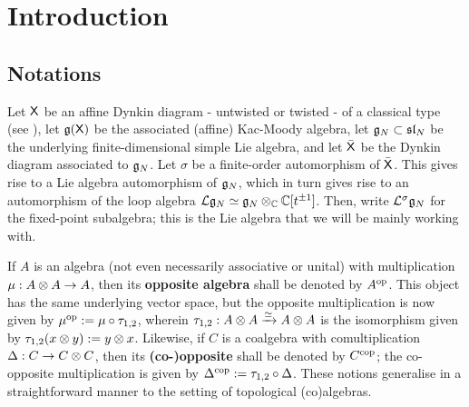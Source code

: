 \section{Introduction}
    \subsection{Notations}
        Let $\mathsf{X}$ be an affine Dynkin diagram - untwisted or twisted - of a classical type (see \cite[Chapter 4, Tables Aff 2 and 3, p. 55]{kac_infinite_dimensional_lie_algebras}), let $\mathfrak{g}(\mathsf{X})$ be the associated (affine) Kac-Moody algebra, let $\mathfrak{g}_N \subset \mathfrak{sl}_N$ be the underlying finite-dimensional simple Lie algebra, and let $\bar{\mathsf{X}}$ be the Dynkin diagram associated to $\mathfrak{g}_N$. Let $\sigma$ be a finite-order automorphism of $\bar{\mathsf{X}}$. This gives rise to a Lie algebra automorphism of $\mathfrak{g}_N$, which in turn gives rise to an automorphism of the loop algebra $\Loop\g_N \cong \g_N \tensor_{\bbC} \bbC[t^{\pm 1}]$. Then, write $\mathcal{L}^{\sigma}\mathfrak{g}_N$ for the fixed-point subalgebra; this is the Lie algebra that we will be mainly working with.

        If $A$ is an algebra (not even necessarily associative or unital) with multiplication $\mu: A \tensor A \to A$, then its \textbf{opposite algebra} shall be denoted by $A^{\mathrm{op}}$. This object has the same underlying vector space, but the opposite multiplication is now given by $\mu^{\mathrm{op}} := \mu \circ \tau_{1, 2}$, wherein $\tau_{1, 2}: A \tensor A \xrightarrow[]{\cong} A \tensor A$ is the isomorphism given by $\tau_{1, 2}(x \tensor y) := y \tensor x$. Likewise, if $C$ is a coalgebra with comultiplication $\Delta: C \to C \tensor C$, then its \textbf{(co-)opposite} shall be denoted by $C^{\mathrm{cop}}$; the co-opposite multiplication is given by $\Delta^{\mathrm{cop}} := \tau_{1, 2} \circ \Delta$. These notions generalise in a straightforward manner to the setting of topological (co)algebras.

